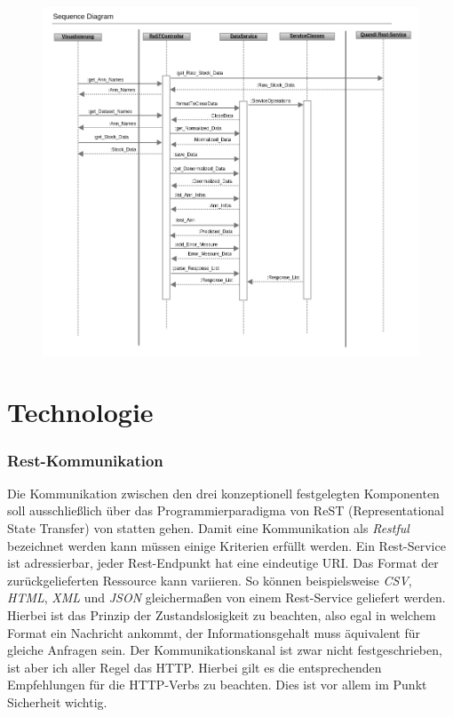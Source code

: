 \begin{figure}
\includegraphics[width=15cm]{Bilder/Konzeption/sequence_dia_rest_env.png}
\end{figure}


\section{Technologie}
\label{section:Technologie}

\subsubsection{Rest-Kommunikation}
Die Kommunikation zwischen den drei konzeptionell festgelegten Komponenten soll ausschließlich über das Programmierparadigma von ReST (Representational State Transfer) von statten gehen. Damit eine Kommunikation als \emph{Restful} bezeichnet werden kann müssen einige Kriterien erfüllt werden. Ein Rest-Service ist adressierbar, jeder Rest-Endpunkt hat eine eindeutige URI. Das Format der zurückgelieferten Ressource kann variieren. So können beispielsweise \emph{CSV}, \emph{HTML}, \emph{XML} und \emph{JSON} gleichermaßen von einem Rest-Service geliefert werden. Hierbei ist das Prinzip der Zustandslosigkeit zu beachten, also egal in welchem Format ein Nachricht ankommt, der Informationsgehalt muss äquivalent für gleiche Anfragen sein. Der Kommunikationskanal ist zwar nicht festgeschrieben, ist aber ich aller Regel das HTTP. Hierbei gilt es die entsprechenden Empfehlungen für die HTTP-Verbs zu beachten. Dies ist vor allem im Punkt Sicherheit wichtig.   

